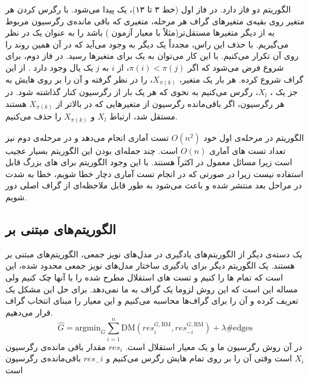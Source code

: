 \documentclass{article}
\begin{document}
	
	الگوریتم 
	 دو فاز دارد. در فاز اول (خط ۳ تا ۱۳)، یک 	 پیدا می‌شود. با رگرس کردن هر متغیر روی بقیه‌ی متغیر‌های گراف هر مرحله، متغیری که باقی مانده‌ی رگرسیون مربوط به از دیگر متغیرها مستقل‌تر(مثلاً با معیار 
	آزمون 
	) باشد را به عنوان یک  
	در نظر می‌گیریم. با حذف این راس، مجدداً یک
	 دیگر به وجود می‌آید که در آن همین روند را روی آن تکرار می‌کنیم. با این کار می‌توان به یک 
برای متغیرها رسید.
در فاز دوم، برای شروع  فرض می‌شود که اگر
	 $\pi(i) < \pi(j)$،
	 از $i$ به $j$ یک یال وجود دارد . از این گراف شروع کرده. هر بار یک متغیر،
	 $X_{\pi(k)}$،
	  را در نظر گرفته و آن را بر روی 
هایش به جز یک 
،
$X_l$،
رگرس می‌کنیم به نحوی که هر 
یک بار از رگرسیون کنار گذاشته شود. در هر رگرسیون، اگر باقی‌مانده رگرسیون از متغیر‌هایی که در 
بالاتر از 
$X_{\pi(k)}$
هستند مستقل شد، ارتباط $X_l$ و $X_{\pi(k)}$ را حذف می‌کنیم. 

الگوریتم 
در مرحله‌ی اول خود 
$O(n^2)$
تست آماری انجام می‌دهد و در مرحله‌ی دوم نیز تعداد تست های آماری
$O(n)$
است. چند جمله‌ای بودن این الگوریتم بسیار عجیب است زیرا مسائل معمول در 
اکثراً 
هستند. با این وجود الگوریتم 
برای  های بزرگ قابل استفاده نیست زیرا در صورتی که در انجام تست آماری دچار خطا شویم، خطا به شدت در مراحل بعد منتشر شده و باعث می‌شود به طور قابل ملاحظه‌ای از گراف اصلی دور شویم. 
\subsection{الگوریتم‌های مبتنی بر 
}
یک دسته‌ی دیگر از الگوریتم‌های یادگیری در مدل‌های نویز جمعی، الگوریتم‌های مبتنی بر 
هستند.
 یک الگوریتم دیگر برای یادگیری ساختار مدل‌های نویز جمعی محدود شده، این است که تمام  
ها را 
کنیم و تست های استقلال مطرح شده را با آنها چک کنیم ولی مساله این است که این روش لزوما یک گراف
به ما نمی‌دهد. برای حل این مشکل یک 
تعریف کرده و آن را برای گراف‌ها محاسبه می‌کنیم و این معیار را مبنای انتخاب گراف قرار می‌دهیم.
$$\hat{G} = \mathrm{argmin}_G \sum_{i=1}^n \mathrm{DM}(res_i^{G, \mathrm{RM}}, res_{-i}^{G, \mathrm{RM}}) + \lambda \#\mathrm{edges}$$
در آن 
روش رگرسیون ما و 
یک معیار استقلال است.
$res_i$
مقدار باقی مانده‌ی رگرسیون $X_i$ است وقتی آن را بر روی تمام 
هایش رگرس می‌کنیم و 
$res_-i$
باقی‌مانده‌ی رگرسیون است 



\end{document}

